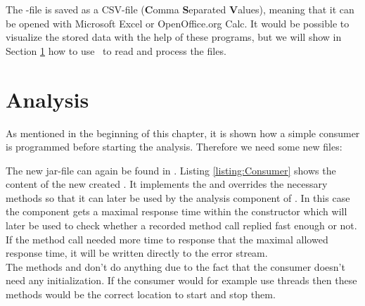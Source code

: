 \noindent The -file is saved as a CSV-file (\textbf{C}omma \textbf{S}eparated \textbf{V}alues), meaning that it can be opened with Microsoft Excel or OpenOffice.org Calc. It would be possible to visualize the stored data with the help of these programs, but we will show in Section \ref{sec:example:analysis} how to use \KiekerAnalysisPart\ to read and process the files.

\section{Analysis}\label{sec:example:analysis}
As mentioned in the beginning of this chapter, it is shown how a simple consumer is programmed before starting the analysis. Therefore we need some new files:
\begin{figure}[H]
\begin{graybox}
\end{graybox}
\end{figure}

The new jar-file can again be found in . Listing \ref{listing:Consumer} shows the content of the new created . It implements the  and overrides the necessary methods so that it can later be used by the analysis component of \Kieker. In this case the component gets a maximal response time within the constructor which will later be used to check whether a recorded method call replied fast enough or not. If the method call needed more time to response that the maximal allowed response time, it will be written directly to the error stream.\\
The methods  and  don't do anything due to the fact that the consumer doesn't need any initialization. If the consumer would for example use threads then these methods would be the correct location to start and stop them.

\setJavaCodeListing       


